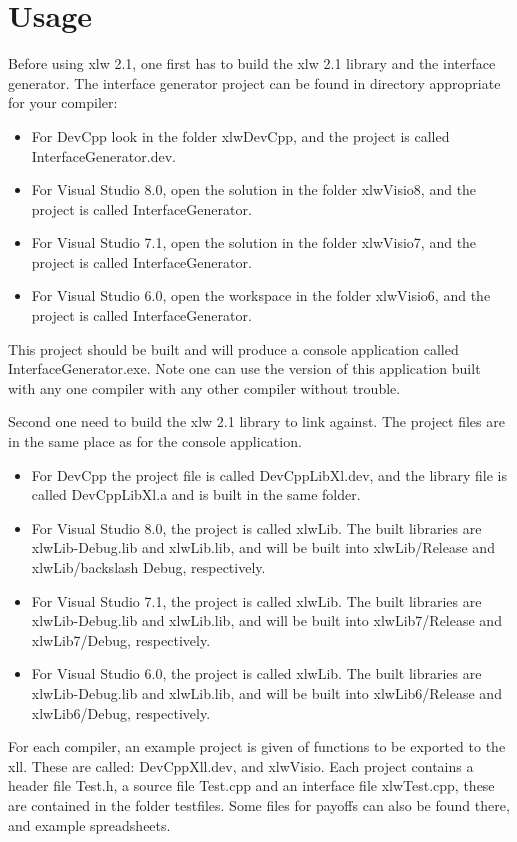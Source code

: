 \documentclass[12pt,reqno]{amsart}
\numberwithin{equation}{section}
\numberwithin{figure}{section}
\begin{document}
\section{Usage}

Before using xlw 2.1, one first has to build the xlw 2.1 library and
the interface generator. The interface generator project can be found
in directory appropriate for your compiler:
\begin{itemize}
\item For DevCpp look in the folder xlwDevCpp, and the project is
  called InterfaceGenerator.dev.
\item For Visual Studio 8.0, open the solution in the folder xlwVisio8, and the
  project is called InterfaceGenerator. 
\item For Visual Studio 7.1, open the solution in the folder xlwVisio7, and the
  project is called InterfaceGenerator. 
\item For Visual Studio 6.0, open the workspace in the folder
  xlwVisio6, and the project is called InterfaceGenerator. 
\end{itemize}
This project should be built and will produce a console application
called InterfaceGenerator.exe. Note one can use the version of this
application built with any one compiler with any other compiler
without trouble. 

Second one need to build the xlw 2.1 library to link against. The
project files are in the same place as for the console application. 
\begin{itemize}
\item For DevCpp the project file is called DevCppLibXl.dev, 
and the
  library file is called  DevCppLibXl.a and is built in the same
  folder. 
\item For Visual Studio 8.0, the project is called xlwLib. The built
  libraries are xlwLib-Debug.lib and xlwLib.lib, and will be built
  into xlwLib/Release and  xlwLib/backslash Debug, respectively. 
\item For Visual Studio 7.1, the project is called xlwLib. The built
  libraries are xlwLib-Debug.lib and xlwLib.lib, and will be built
  into xlwLib7/Release and  xlwLib7/Debug, respectively. 
\item For Visual Studio 6.0, the project is called xlwLib. The built
  libraries are xlwLib-Debug.lib and xlwLib.lib, and will be built
  into xlwLib6/Release and  xlwLib6/Debug, respectively. 
\end{itemize}

For each compiler, an example project is given of functions to be
exported to the xll. These are called: DevCppXll.dev, and xlwVisio.
Each project contains a header file Test.h, a source file
Test.cpp and an interface file xlwTest.cpp, these are contained in the
folder testfiles. Some files for payoffs can also be found there, and
example spreadsheets. 
\end{document}
